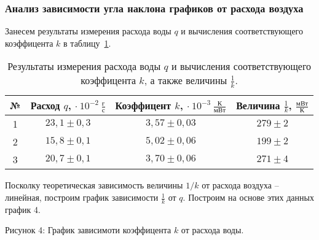 \documentclass[a4paper,11pt]{article}
\begin{document}
\subsubsection{Анализ зависимости угла наклона графиков от расхода воздуха}
Занесем результаты измерения расхода воды $q$ и вычисления соответствующего коэффицента $k$ в таблицу~\ref{table:tab7}.
\begin{table}[h!]
\centering
\begin{tabular}{ ||c|c|c|c|| }
  \hline
  № & Расход $q$, $\cdot\ 10^{-2}\ \frac{г}{с}$ & Коэффицент $k$, $\cdot\ 10^{-3}\ \frac{К}{мВт}$ & Величина $\frac{1}{k}$, $\frac{мВт}{К}$ \\
  \hline
  1 & $23,1 \pm 0,3$ & $3,57 \pm 0,03$ & $279 \pm 2$ \\
  2 & $15,8 \pm 0,1$ & $5,02 \pm 0,06$ & $199 \pm 2$ \\
  3 & $20,7 \pm 0,1$ & $3,70 \pm 0,06$ & $271 \pm 4$ \\
  \hline
\end{tabular}
\caption{Результаты измерения расхода воды $q$ и вычисления соответствующего коэффицента $k$, а также величины $\frac{1}{k}$.}
\label{table:tab7}
\end{table}
\newline
Посколку теоретическая зависимость величины $1/k$ от расхода воздуха -- линейная, построим график зависимости $\frac{1}{k}$ от $q$.\newline
Построим на основе этих данных график 4.\newline\newline
\begin{center}
\newline
Рисунок 4: График зависимоти коэффицента $k$ от расхода воды.\newline
\end{center}
\end{document}
